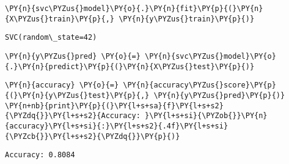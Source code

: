     \begin{tcolorbox}[breakable, size=fbox, boxrule=1pt, pad at break*=1mm,colback=cellbackground, colframe=cellborder]
\begin{Verbatim}[commandchars=\\\{\}]
\PY{n}{svc\PYZus{}model}\PY{o}{.}\PY{n}{fit}\PY{p}{(}\PY{n}{X\PYZus{}train}\PY{p}{,} \PY{n}{y\PYZus{}train}\PY{p}{)}
\end{Verbatim}
\end{tcolorbox}

            \begin{tcolorbox}[breakable, size=fbox, boxrule=.5pt, pad at break*=1mm, opacityfill=0]
\begin{Verbatim}[commandchars=\\\{\}]
SVC(random\_state=42)
\end{Verbatim}
\end{tcolorbox}
        
    \begin{tcolorbox}[breakable, size=fbox, boxrule=1pt, pad at break*=1mm,colback=cellbackground, colframe=cellborder]
\begin{Verbatim}[commandchars=\\\{\}]
\PY{n}{y\PYZus{}pred} \PY{o}{=} \PY{n}{svc\PYZus{}model}\PY{o}{.}\PY{n}{predict}\PY{p}{(}\PY{n}{X\PYZus{}test}\PY{p}{)}
\end{Verbatim}
\end{tcolorbox}

    \begin{tcolorbox}[breakable, size=fbox, boxrule=1pt, pad at break*=1mm,colback=cellbackground, colframe=cellborder]
\begin{Verbatim}[commandchars=\\\{\}]
\PY{n}{accuracy} \PY{o}{=} \PY{n}{accuracy\PYZus{}score}\PY{p}{(}\PY{n}{y\PYZus{}test}\PY{p}{,} \PY{n}{y\PYZus{}pred}\PY{p}{)}
\PY{n+nb}{print}\PY{p}{(}\PY{l+s+sa}{f}\PY{l+s+s2}{\PYZdq{}}\PY{l+s+s2}{Accuracy: }\PY{l+s+si}{\PYZob{}}\PY{n}{accuracy}\PY{l+s+si}{:}\PY{l+s+s2}{.4f}\PY{l+s+si}{\PYZcb{}}\PY{l+s+s2}{\PYZdq{}}\PY{p}{)}
\end{Verbatim}
\end{tcolorbox}

    \begin{Verbatim}[commandchars=\\\{\}]
Accuracy: 0.8084
    \end{Verbatim}

